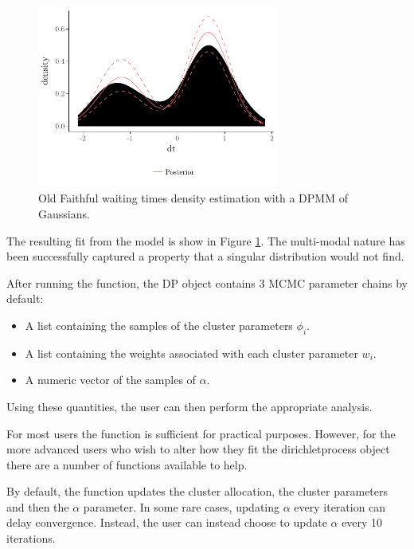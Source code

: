\documentclass[nojss]{jss}
\begin{document}
\begin{figure}[tb]
\centering
	\includegraphics[height=60mm, width=80mm]{img/old_faithful_plot.pdf}
	\caption{Old Faithful waiting times density estimation with a DPMM of Gaussians. }
	\label{fig:oldfaithful}
\end{figure}
The resulting fit from the model is show in Figure \ref{fig:oldfaithful}. The multi-modal nature has been successfully captured a property that a singular distribution would not find.

After running the  function, the DP object contains 3 MCMC parameter chains by default:
\begin{itemize}
\item A list containing the samples of the cluster parameters $\phi _i$.
\item A list containing the weights associated with each cluster parameter $w_i$.
\item A numeric vector of the samples of $\alpha$.
\end{itemize}
Using these quantities, the user can then perform the appropriate analysis.

For most users the  function is sufficient for practical purposes. However, for the more advanced users who wish to alter how they fit the dirichletprocess object there are a number of functions available to help.

By default, the  function updates the cluster allocation, the cluster parameters and then the $\alpha$ parameter. In some rare cases, updating $\alpha$ every iteration can delay convergence. Instead, the user can instead choose to update $\alpha$ every 10 iterations.
\begin{Schunk}
\end{Schunk}
\end{document}
